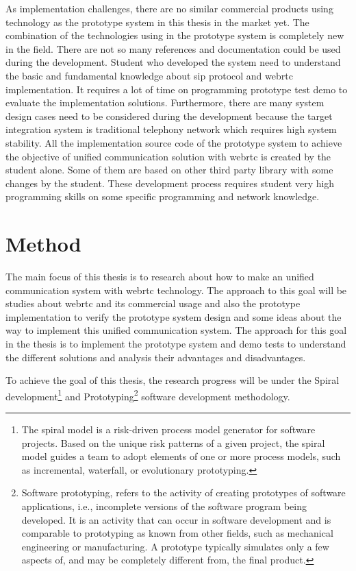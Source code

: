 \par As implementation challenges, there are no similar commercial products using technology as the prototype system in this thesis in the market yet. The combination of the technologies using in the prototype system is completely new in the field. There are not so many references and documentation could be used during the development. Student who developed the system need to understand the basic and fundamental knowledge about \gls{sip} protocol and \gls{webrtc} implementation. It requires a lot of time on programming prototype test demo to evaluate the implementation solutions. Furthermore, there are many system design cases need to be considered during the development because the target integration system is traditional telephony network which requires high system stability. All the implementation source code of the prototype system to achieve the objective of unified communication solution with \gls{webrtc} is created by the student alone. Some of them are based on other third party library with some changes by the student. These development process requires student very high programming skills on some specific programming and network knowledge.

\section{Method}

\noindent The main focus of this thesis is to research about how to make an unified communication system with \gls{webrtc} technology. The approach to this goal will be studies about \gls{webrtc} and its commercial usage and also the prototype implementation to verify the prototype system design and some ideas about the way to implement this unified communication system. The approach for this goal in the thesis is to implement the prototype system and demo tests to understand the different solutions and analysis their advantages and disadvantages.

\par To achieve the goal of this thesis, the research progress will be under the Spiral development\footnote{The spiral model is a risk-driven process model generator for software projects. Based on the unique risk patterns of a given project, the spiral model guides a team to adopt elements of one or more process models, such as incremental, waterfall, or evolutionary prototyping.\cite{wiki:spiral}} and Prototyping\footnote{Software prototyping, refers to the activity of creating prototypes of software applications, i.e., incomplete versions of the software program being developed. It is an activity that can occur in software development and is comparable to prototyping as known from other fields, such as mechanical engineering or manufacturing.
A prototype typically simulates only a few aspects of, and may be completely different from, the final product.\cite{wiki:prototyping}} software development methodology. 


